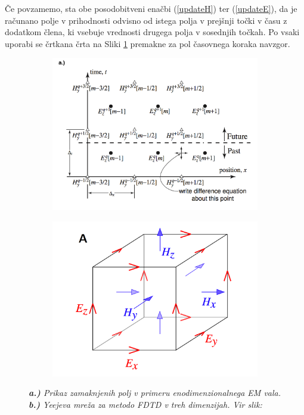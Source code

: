 \documentclass[longbibliography,slovene,a4paper,12pt]{book}
\begin{document}
Če povzamemo, sta obe posodobitveni enačbi (\ref{updateH}) ter (\ref{updateE}), da je računano polje v prihodnosti odvisno od istega polja v prejšnji točki v času z dodatkom člena, ki vsebuje vrednosti drugega polja v sosednjih točkah. Po vsaki uporabi se črtkana črta na Sliki \ref{fig:staggeredfields} premakne za pol časovnega koraka navzgor.

\begin{figure}[h!]
	\centering
	\begin{subfigure}[b]{0.45\textwidth}
	\includegraphics[width=\textwidth]{slike/staggered_fields.png}
	\label{fig:staggeredfields}
	\end{subfigure}\quad
	\begin{subfigure}[b]{0.45\textwidth}
	\includegraphics[width=\textwidth]{slike/yee_lattice_fields.png}
	\label{fig:yeelattice}
	\end{subfigure}
	\caption{\emph{\textbf{a.)} Prikaz zamaknjenih polj v primeru enodimenzionalnega EM vala. \textbf{b.)} Yeejeva mreža za metodo FDTD v treh dimenzijah. Vir slik: \cite{lavrinenko, cancula}}}
\end{figure}
\end{document}
